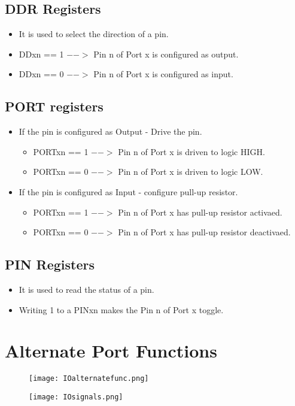 \documentclass{article}
\begin{document}
\subsection{DDR Registers}
\begin{itemize}
    \item It is used to select the direction of a pin.
    \item DDxn == 1 $-->$ Pin n of Port x is configured as output.
    \item DDxn == 0 $-->$ Pin n of Port x is configured as input.
\end{itemize}

\subsection{PORT registers}
\begin{itemize}
    \item If the pin is configured as Output - Drive the pin.
    \begin{itemize}
        \item PORTxn == 1 $-->$ Pin n of Port x is driven to logic HIGH.
        \item PORTxn == 0 $-->$ Pin n of Port x is driven to logic LOW.
    \end{itemize}
    \item If the pin is configured as Input - configure pull-up resistor.
    \begin{itemize}
        \item PORTxn == 1 $-->$ Pin n of Port x has pull-up resistor activaed.
        \item PORTxn == 0 $-->$ Pin n of Port x has pull-up resistor deactivaed.
    \end{itemize}
\end{itemize}

\subsection{PIN Registers}
\begin{itemize}
    \item It is used to read the status of a pin.
    \item Writing 1 to a PINxn makes the Pin n of Port x toggle.
\end{itemize}

\section{Alternate Port Functions}
\begin{figure}[H]
    \begin{center}
        \texttt{[image: IOalternatefunc.png]}
    \end{center}
\end{figure}

\begin{figure}[H]
    \begin{center}
        \texttt{[image: IOsignals.png]}
    \end{center}
\end{figure}
\end{document}
